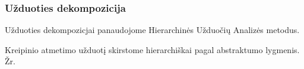 	\subsubsection {Užduoties dekompozicija}
	Užduoties dekompozicjai panaudojome Hierarchinės Užduočių Analizės metodus.
 		
	Kreipinio atmetimo užduotį skirstome hierarchiškai pagal abstraktumo lygmenis. Žr. 
